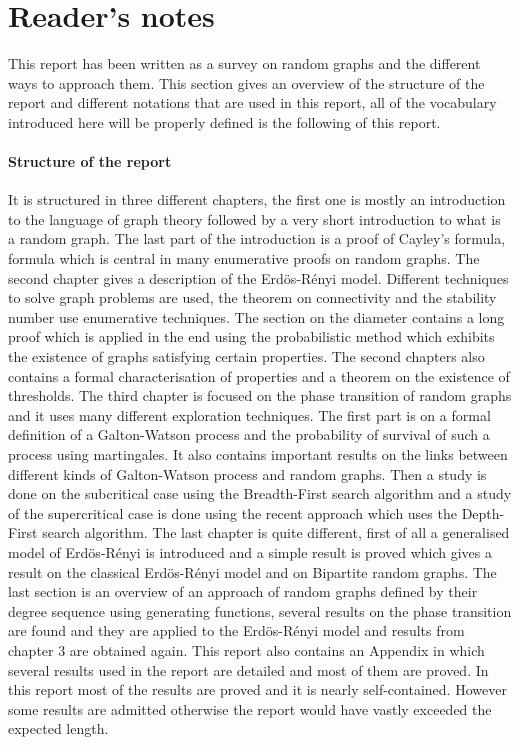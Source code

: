 \newtheorem{theorem}{Theorem}[section]
\newtheorem{corollary}{Corollary}[theorem]
\newtheorem{lemma}[theorem]{Lemma}
\section{Reader's notes}
This report has been written as a survey on random graphs and the different ways to approach them.
This section gives an overview of the structure of the report and different notations that are used in this report, all of the vocabulary introduced here will be properly defined is the following of this report.
\paragraph{Structure of the report}
It is structured in three different chapters, the first one is mostly an introduction to the language of graph theory followed by a very short introduction to what is a random graph.
The last part of the introduction is a proof of Cayley's formula, formula which is central in many enumerative proofs on random graphs.
\newline
The second chapter gives a description of the Erd\"os-R\'enyi model. 
Different techniques to solve graph problems are used, the theorem on connectivity and the stability number use enumerative techniques. 
The section on the diameter contains a long proof which is applied in the end using the probabilistic method which exhibits the existence of graphs satisfying certain properties.
The second chapters also contains a formal characterisation of properties and a theorem on the existence of thresholds.
\newline
The third chapter is focused on the phase transition of random graphs and it uses many different exploration techniques.
The first part is on a formal definition of a Galton-Watson process and the probability of survival of such a process using martingales.
It also contains important results on the links between different kinds of Galton-Watson process and random graphs.
Then a study is done on the subcritical case using the Breadth-First search algorithm and a study of the supercritical case 
is done using the recent approach which uses the Depth-First search algorithm.
\newline
The last chapter is quite different, first of all a generalised model of Erd\"os-R\'enyi is introduced and a simple result is proved which gives a result on the classical Erd\"os-R\'enyi model and on Bipartite random graphs.
The last section is an overview of an approach of random graphs defined by their degree sequence using generating functions, several results on the phase transition are found and they are applied to the Erd\"os-R\'enyi model and results from chapter 3 are obtained again.
\newline
This report also contains an Appendix in which several results used in the report are detailed and most of them are proved.
\newline
In this report most of the results are proved and it is nearly self-contained.
However some results are admitted otherwise the report would have vastly exceeded the expected length.
